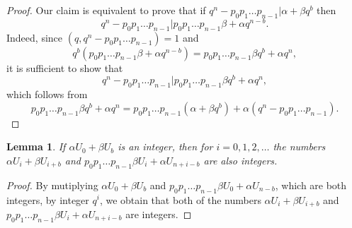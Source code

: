\documentclass[12pt, twoside, leqno]{article}
\newtheorem{lemma}[theorem]{Lemma}
\theoremstyle{definition}
\numberwithin{equation}{section}
\begin{document}
\begin{proof} Our claim is equivalent to prove that if $q^n-p_0p_1\ldots p_{n-1}|\alpha +\beta q^b$ then $$q^n-p_0p_1\ldots p_{n-1}| p_0 p_1\ldots p_{n-1}\beta+ \alpha q^{n-b}.$$ Indeed, since $(q,q^n-p_0p_1\ldots p_{n-1})=1$ and
$$q^b(p_0 p_1\ldots p_{n-1}\beta+ \alpha q^{n-b})= p_0 p_1\ldots p_{n-1}\beta q^b+ \alpha q^{n},$$
it is sufficient to show that $$q^n-p_0p_1\ldots p_{n-1}| p_0 p_1\ldots p_{n-1}\beta q^b+ \alpha q^{n},$$ which follows from
$$p_0 p_1\ldots p_{n-1}\beta q^b+ \alpha q^{n}=p_0 p_1\ldots p_{n-1}(\alpha+\beta q^b)+ \alpha (q^{n}-p_0 p_1\ldots p_{n-1}).$$
\end{proof}
\begin{lemma}{If $\alpha U_0+\beta U_b$ is an integer, then for $i=0,1,2,\ldots$ the numbers $\alpha U_i+\beta U_{i+b}$ and $p_0 p_1\ldots p_{n-1}\beta U_i+\alpha U_{n+i-b}$ are also integers.}
\end{lemma}
\begin{proof} By mutiplying $\alpha U_0+\beta U_b$ and $p_0 p_1\ldots p_{n-1}\beta U_0+\alpha U_{n-b}$, which are both integers, by integer $q^i$, we obtain that both of the numbers $\alpha U_i+\beta U_{i+b}$ and $p_0 p_1\ldots p_{n-1}\beta U_i+\alpha U_{n+i-b}$ are integers.
\end{proof}
\end{document}

